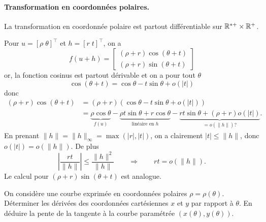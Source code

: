 \paragraph{Transformation en coordonnées polaires.} 

\begin{proposition*}
  La transformation en coordonnée polaire est partout différentiable sur $\mathbb{R}^{*+} \times \mathbb{R}^+$.
\end{proposition*}

\proof
Pour $u = [\rho \; \theta]^\top$ et $h = [r \; t ]^\top$, on a
$$
f(u+h) = \left[\begin{array}{c} 
    (\rho+r) \cos(\theta +t) \\ (\rho+r) \sin(\theta +t) 
    \end{array} \right]
$$
or, la fonction cosinus est partout dérivable et on a pour tout $\theta$
$$
\cos(\theta +t) = \cos \theta - t \sin \theta + o(|t|)
$$
donc
\begin{align*}
  (\rho+r) \cos(\theta +t) 
  & =  (\rho+r) (\cos \theta - t \sin \theta + o(|t|)) \\
  & = \underset{f(u)}{\underbrace{\rho \cos \theta}} 
  - \underset{\text{linéaire en $h$}}{\underbrace{\rho t \sin \theta + r \cos \theta}} 
  - \underset{= o(\|h\|) ?}{\underbrace{rt \sin \theta + (\rho + r) o(|t|)}}.
\end{align*}
En prenant $\|h\| = \|h\|_\infty = \max(|r|, |t|)$, on a clairement $|t| \leq \|h\|$, donc $o(|t|) = o(\|h\|)$. De plus
$$
\left|\frac{rt}{\|h\|}\right| 
\leq \frac{\|h\|^2}{\|h\|}
\qquad \Rightarrow \qquad 
rt = o(\|h\|).
$$
Le calcul pour $(\rho+r) \sin(\theta +t)$ est analogue.
\eproof


\begin{exercise*}[A faire]
  On considère une courbe exprimée en coordonnées polaires $\rho = \rho(\theta)$. Déterminer les dérivées des coordonnées cartésiennes $x$ et $y$ par rapport à $\theta$. En déduire la pente de la tangente à la courbe paramétrée $(x(\theta), y(\theta))$.
\end{exercise*}

